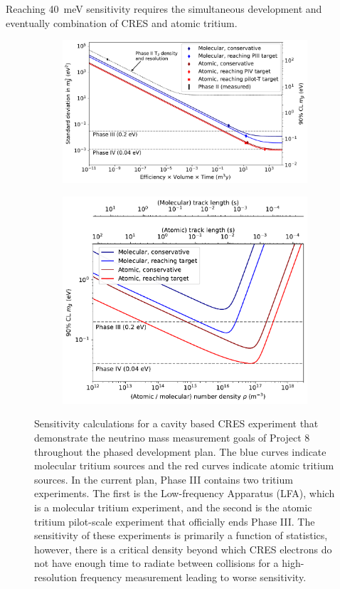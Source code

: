 Reaching 40~meV sensitivity requires the simultaneous development and eventually combination of CRES and atomic tritium.
\begin{figure}[htbp]
    \centering
    \begin{subfigure}{0.725\textwidth}
        \includegraphics*[width=\textwidth]{figs/Chapter-3/sensitivity_vs_exposure_curve.pdf}
    \end{subfigure}
    \begin{subfigure}{0.67\textwidth}
        \includegraphics*[width=\textwidth]{figs/Chapter-3/sensitivity_vs_density_curve.pdf}
    \end{subfigure}
    \caption{Sensitivity calculations for a cavity based CRES experiment that demonstrate the neutrino mass measurement goals of Project 8 throughout the phased development plan. The blue curves indicate molecular tritium sources and the red curves indicate atomic tritium sources. In the current plan, Phase III contains two tritium experiments. The first is the Low-frequency Apparatus (LFA), which is a molecular tritium experiment, and the second is the atomic tritium pilot-scale experiment that officially ends Phase III. The sensitivity of these experiments is primarily a function of statistics, however, there is a critical density beyond which CRES electrons do not have enough time to radiate between collisions for a high-resolution frequency measurement leading to worse sensitivity. }
\end{figure}

